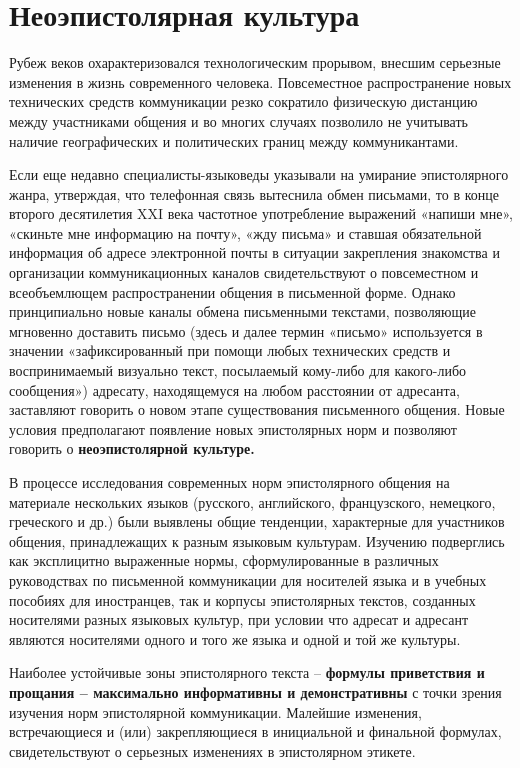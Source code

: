 \section{Неоэпистолярная культура}


Рубеж веков охарактеризовался технологическим прорывом, внесшим серьезные изменения в жизнь современного человека. Повсеместное распространение новых технических средств коммуникации резко сократило физическую дистанцию между участниками общения и во многих случаях позволило не учитывать наличие географических и политических границ между коммуникантами.

Если еще недавно специалисты-языковеды указывали на умирание эпистолярного жанра, утверждая, что телефонная связь вытеснила обмен письмами, то в конце второго десятилетия XXI века частотное употребление выражений «напиши мне», «скиньте мне информацию на почту», «жду письма» и ставшая обязательной информация об адресе электронной почты в ситуации закрепления знакомства и организации коммуникационных каналов свидетельствуют о повсеместном и всеобъемлющем распространении общения в письменной форме.
Однако принципиально новые каналы обмена письменными текстами,
позволяющие мгновенно доставить письмо (здесь и далее термин «письмо» используется в значении «зафиксированный при помощи любых технических средств и воспринимаемый визуально текст, посылаемый кому-либо для какого-либо сообщения») адресату, находящемуся на любом расстоянии от адресанта, заставляют говорить о новом этапе существования письменного общения. Новые условия предполагают появление новых эпистолярных норм и позволяют говорить о \textbf{неоэпистолярной культуре.}

В процессе исследования современных норм эпистолярного общения
на материале нескольких языков (русского, английского, французского, немецкого, греческого и др.) были выявлены общие тенденции, характерные для участников общения, принадлежащих к разным языковым культурам. 
Изучению подверглись как эксплицитно выраженные нормы, сформулированные в различных руководствах по письменной коммуникации для носителей языка и в учебных пособиях для иностранцев, так и корпусы эпистолярных текстов, созданных носителями разных языковых культур, при условии что адресат и адресант являются носителями одного и того же языка и одной и той же культуры.

Наиболее устойчивые зоны эпистолярного текста – \textbf{формулы приветствия и прощания – максимально информативны и демонстративны} с точки зрения изучения норм эпистолярной коммуникации. Малейшие изменения, встречающиеся и (или) закрепляющиеся в инициальной и финальной формулах, свидетельствуют о серьезных изменениях в эпистолярном этикете.

